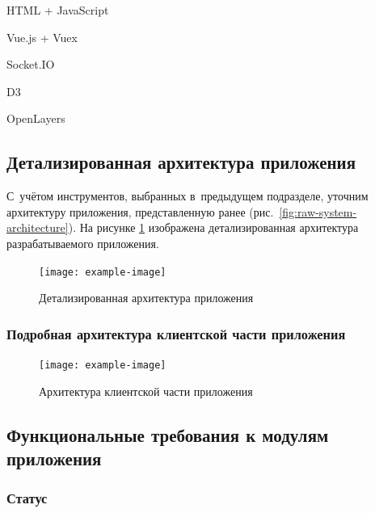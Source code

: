 \begin{dashitemize}
  \item HTML + JavaScript
  \item Vue.js + Vuex
  \item Socket.IO
  \item D3
  \item OpenLayers
\end{dashitemize}

\subsection{Детализированная архитектура приложения}
\label{subsec:app-architecture}

С~учётом инструментов, выбранных в~предыдущем подразделе, уточним архитектуру приложения, представленную ранее (рис.~\ref{fig:raw-system-architecture}). На рисунке \ref{fig:complete-system-architecture} изображена детализированная архитектура разрабатываемого приложения.

\begin{figure}[h!]
  \centering
  \setlength{\fboxsep}{5pt}
  \texttt{[image: example-image]}
  \vspace*{12pt}
  \caption{Детализированная архитектура приложения}\label{fig:complete-system-architecture}
\end{figure}

\subsubsection{Подробная архитектура клиентской части приложения}
\label{subsec:frontend-architecture}

\begin{figure}[h!]
  \centering
  \setlength{\fboxsep}{5pt}
  \texttt{[image: example-image]}
  \vspace*{12pt}
  \caption{Архитектура клиентской части приложения}\label{fig:fe-architecture}
\end{figure}

\subsection{Функциональные требования к модулям приложения}
\label{subsec:app-modules-requirements}

\subsubsection{Статус}

